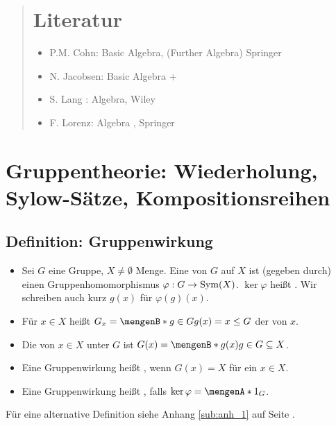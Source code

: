 
\newcommand{\fach}{Höhere Algebra \RM{1}}
\newcommand{\semester}{SoSe 2014}
\newcommand{\homepage}{http://wwwmath.uni-muenster.de/u/franziska.jahnke/ha/}

\newcommand{\prof}{Prof.\,Dr.\,Dr.\,Katrin Tent}



\maketitle
{}
\begin{abstract}

\section*{Literatur}
\begin{itemize}
	\item P.M. Cohn: Basic Algebra, (Further Algebra) Springer
	\item N. Jacobsen: Basic Algebra  + 
	\item S. Lang : Algebra, Wiley
	\item F. Lorenz: Algebra , Springer
\end{itemize}
\end{abstract}
\tableofcontents
\cleardoubleoddemptypage
\newpage
{}
\setcounter{page}{1}

\section{Gruppentheorie: Wiederholung, Sylow-Sätze, Kompositionsreihen} %
\label{sec:1}

\subsection{Definition: Gruppenwirkung} %
\label{sub:11}
\begin{itemize}
	\item Sei $G$ eine Gruppe, $X \not= \emptyset$ Menge. Eine  von $G$ auf $X$ ist (gegeben durch) einen Gruppenhomomorphismus 
	$\varphi : G \to \operatorname{Sym}(X)$. $\ker \varphi$ heißt . Wir schreiben auch kurz $g(x)$ für $\varphi(g)(x)$.
	\item Für $x \in X$ heißt $G_x = \set[g \in G]{g(x) = x} \le G $ der  von $x$.
	\item Die  von $x \in X$ unter $G$ ist $G(x) = \set[g(x)]{g \in G} \subseteq X$. 
	\item Eine Gruppenwirkung heißt , wenn $G(x)=X$ für ein $x \in X$.
	\item Eine Gruppenwirkung heißt , falls $\ker \varphi = \set{1_G}$. 
\end{itemize}
Für eine alternative Definition siehe Anhang \ref{sub:anh_1} auf Seite \pageref{sub:anh_1}.

